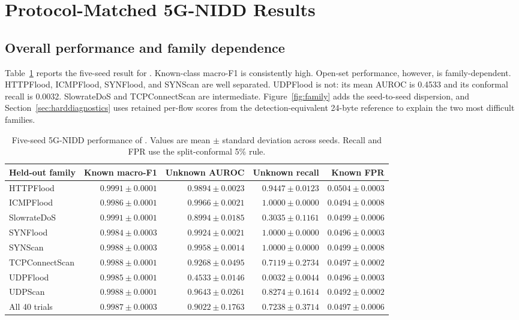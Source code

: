 \section{Protocol-Matched 5G-NIDD Results}

\subsection{Overall performance and family dependence}

Table~\ref{tab:familymain} reports the five-seed result for \compactmethod{}. Known-class macro-F1 is consistently high. Open-set performance, however, is family-dependent. HTTPFlood, ICMPFlood, SYNFlood, and SYNScan are well separated. UDPFlood is not: its mean AUROC is 0.4533 and its conformal recall is 0.0032. SlowrateDoS and TCPConnectScan are intermediate. Figure~\ref{fig:family} adds the seed-to-seed dispersion, and Section~\ref{sec:harddiagnostics} uses retained per-flow scores from the detection-equivalent 24-byte reference to explain the two most difficult families.

\begin{table}[H]
\caption{Five-seed 5G-NIDD performance of \compactmethod{}. Values are mean $\pm$ standard deviation across seeds. Recall and FPR use the split-conformal 5\% rule.}
\label{tab:familymain}
\centering
\small
\begin{tabular}{lrrrr}
\toprule
Held-out family & Known macro-F1 & Unknown AUROC & Unknown recall & Known FPR \\
\midrule
HTTPFlood & $0.9991\pm0.0001$ & $0.9894\pm0.0023$ & $0.9447\pm0.0123$ & $0.0504\pm0.0003$ \\
ICMPFlood & $0.9986\pm0.0001$ & $0.9966\pm0.0021$ & $1.0000\pm0.0000$ & $0.0494\pm0.0008$ \\
SlowrateDoS & $0.9991\pm0.0001$ & $0.8994\pm0.0185$ & $0.3035\pm0.1161$ & $0.0499\pm0.0006$ \\
SYNFlood & $0.9984\pm0.0003$ & $0.9924\pm0.0021$ & $1.0000\pm0.0000$ & $0.0496\pm0.0003$ \\
SYNScan & $0.9988\pm0.0003$ & $0.9958\pm0.0014$ & $1.0000\pm0.0000$ & $0.0499\pm0.0008$ \\
TCPConnectScan & $0.9988\pm0.0001$ & $0.9268\pm0.0495$ & $0.7119\pm0.2734$ & $0.0497\pm0.0002$ \\
UDPFlood & $0.9985\pm0.0001$ & $0.4533\pm0.0146$ & $0.0032\pm0.0044$ & $0.0496\pm0.0003$ \\
UDPScan & $0.9988\pm0.0001$ & $0.9643\pm0.0261$ & $0.8274\pm0.1614$ & $0.0492\pm0.0002$ \\
\midrule
All 40 trials & $0.9987\pm0.0003$ & $0.9022\pm0.1763$ & $0.7238\pm0.3714$ & $0.0497\pm0.0006$ \\
\bottomrule
\end{tabular}
\end{table}


